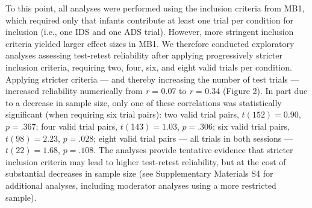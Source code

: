 \documentclass[
  english,
  man,floatsintext]{apa6}
\begin{document}
To this point, all analyses were performed using the inclusion criteria from MB1, which required only that infants contribute at least one trial per condition for inclusion (i.e., one IDS and one ADS trial).
However, more stringent inclusion criteria yielded larger effect sizes in MB1.
We therefore conducted exploratory analyses assessing test-retest reliability after applying progressively stricter inclusion criteria, requiring two, four, six, and eight valid trials per condition.
Applying stricter criteria --- and thereby increasing the number of test trials --- increased reliability numerically from \emph{r} = 0.07 to \emph{r} = 0.34 (Figure 2).
In part due to a decrease in sample size, only one of these correlations was statistically significant (when requiring six trial pairs): two valid trial pairs, \(t(152) = 0.90\), \(p = .367\); four valid trial pairs, \(t(143) = 1.03\), \(p = .306\); six valid trial pairs, \(t(98) = 2.23\), \(p = .028\); eight valid trial pairs --- all trials in both sessions --- \(t(22) = 1.68\), \(p = .108\).
The analyses provide tentative evidence that stricter inclusion criteria may lead to higher test-retest reliability, but at the cost of substantial decreases in sample size (see Supplementary Materials S4 for additional analyses, including moderator analyses using a more restricted sample).
\end{document}
